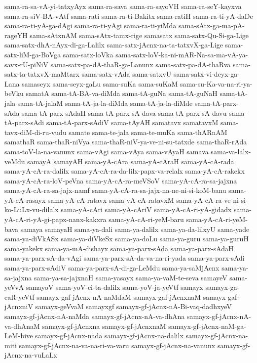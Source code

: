 {sama-ra-sa-vA-yi-tatxyAyx
sama-ra-sava
sama-ra-sayoVH
sama-ra-seY-kayxva
sama-ra-siV-BA-vAtf
sama-rati
sama-ra-ti-Bakitx
sama-ratiH
sama-ra-ti-yA-daDe
sama-ra-ti-yA-ga-dAgi
sama-ra-ti-yAgi
sama-ra-ti-yiMda
sama-sAtx-ga-ma-pA-rageYH
sama-sAtxnAM
sama-sAtx-tamx-rige
samasatx
sama-satx-Qu-Si-ga-Lige
sama-satx-dhA-nAyx-di-ga-Lalilx
sama-satx-jAcnx-na-ta-tatxvX-ga-Lige
sama-satx-liM-ga-BoVga
sama-satx-loVka
sama-satx-loV-ka-ni-mAR-Na-sa-ma-vA-ya-savx-rU-piNiV
sama-satx-pa-dA-thaR-ga-Lanunx
sama-satx-pa-dA-thaRva
sama-satx-ta-tatxvX-maMtarx
sama-satx-vAda
sama-satxvU
sama-satx-vi-deyx-ga-Lana
samaseyx
sama-seyx-gaLu
sama-suKa
sama-suKaM
sama-su-Ka-va-na-ri-ya-beVku
samatA
sama-tA-BA-va-diMda
sama-tA-guNa
sama-tA-guNaH
sama-tA-jala
sama-tA-jalaM
sama-tA-ja-la-diMda
sama-tA-ja-la-diMde
sama-tA-parx-sAda
sama-tA-parx-sAdaH
sama-tA-parx-sA-dava
sama-tA-parx-sA-davu
sama-tA-parx-sAdi
sama-tA-parx-sAdiV
sama-tAyAH
samatavx
samatavxM
sama-tavx-diM-di-ru-vudu
samate
sama-te-jala
sama-te-muKa
sama-thARnAM
samathaR
sama-thaR-niVya
sama-thaR-niV-ya-ve-ni-su-tatxde
sama-thaR-rAda
sama-toV-la-na-vanunx
sama-vAgi
sama-vAya
sama-vAyaH
samava
sama-va-lalx-veMdu
samayA
samayAH
sama-yA-cAra
sama-yA-cAraH
sama-yA-cA-rada
sama-yA-cA-ra-dalilx
sama-yA-cA-ra-da-lilx-papx-va-relalx
sama-yA-cA-rakekx
sama-yA-cA-ra-loV-peVna
sama-yA-cA-ra-meVSoV
sama-yA-cA-ra-sa-jajxna
sama-yA-cA-ra-sa-jajx-namf
sama-yA-cA-ra-sa-jajx-na-ne-ni-si-koM-banu
sama-yA-cA-rasayx
sama-yA-cA-ratavx
sama-yA-cA-ratavxM
sama-yA-cA-ra-ve-ni-si-ko-LuLx-vu-dilalx
sama-yA-cAri
sama-yA-cAriV
sama-yA-cA-ri-yA-gidadx
sama-yA-cA-ri-yA-gi-papx-nanx-kakxra
sama-yA-cA-ri-yeM-baru
sama-yA-cA-ri-yeM-bava
samaya
samayaH
sama-ya-dali
sama-ya-dalilx
sama-ya-da-lilxyU
sama-yade
sama-ya-diVkASx
sama-ya-diVkeSx
sama-ya-doLu
sama-ya-guru
sama-ya-guruH
sama-yakekx
sama-ya-mA-dishayx
sama-ya-parx-sAda
sama-ya-parx-sAdaH
sama-ya-parx-sA-da-vAgi
sama-ya-parx-sA-da-va-na-ri-yada
sama-ya-parx-sAdi
sama-ya-parx-sAdiV
sama-ya-parx-sA-di-ga-LeMdu
sama-ya-saMjAcnx
sama-ya-sa-jajxna
sama-ya-sa-jajxnaH
sama-yasayx
sama-ya-vaM-te-seva
samayeV
sama-yeVvA
samayoV
sama-yoV-ci-ta-dalilx
sama-yoV-ja-yeVtf
samayx
samayx-ga-caR-yeVtf
samayx-gaf-jAcnx-nA-naMdaM
samayx-gaf-jAcnxnaM
samayx-gaf-jAcnxniV
samayx-geVvaM
samayxgf
samayx-gf-jAcnx-nA-Bi-vaq-dadhxyeV
samayx-gf-jAcnx-nA-naMda
samayx-gf-jAcnx-nA-va-dhAna
samayx-gf-jAcnx-nA-va-dhAnaM
samayx-gf-jAcnxna
samayx-gf-jAcnxnaM
samayx-gf-jAcnx-naM-ga-LeM-bive
samayx-gf-jAcnx-nada
samayx-gf-jAcnx-na-dalilx
samayx-gf-jAcnx-na-miti
samayx-gf-jAcnx-na-va-na-ri-va-varu
samayx-gf-jAcnx-na-vanunx
samayx-gf-jAcnx-na-vuLaLx
}
